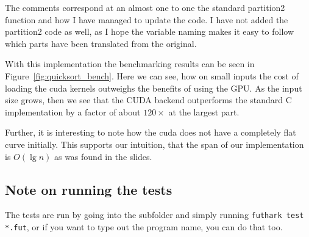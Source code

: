 The comments correspond at an almost one to one the standard partition2
function and how I have managed to update the code. I have not added the
partition2 code as well, as I hope the variable naming makes it easy to follow
which parts have been translated from the original.

With this implementation the benchmarking results can be seen in Figure~\ref{fig:quicksort_bench}.
Here we can see, how on small inputs the cost of loading the cuda kernels
outweighs the benefits of using the GPU. As the input size grows, then we see
that the CUDA backend outperforms the standard C implementation by a factor of
about $120\times$ at the largest part. 

Further, it is interesting to note how the cuda does not have a completely flat
curve initially. This supports our intuition, that the span of our
implementation is $O(\lg n)$ as was found in the slides.

\subsection*{Note on running the tests}
The tests are run by going into the subfolder and simply running
\texttt{futhark test *.fut}, or if you want to type out the program name, you
can do that too.

